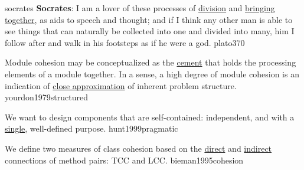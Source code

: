 \documentclass{article}
\begin{document}

\lnQuote
  {socrates}
  {\textbf{Socrates}: I am a lover of these processes of \ul{division} and \ul{bringing together}, as aids to speech and thought; and if I think any other man is able to see things that can naturally be collected into one and divided into many, him I follow after and walk in his footsteps as if he were a god.}
  {plato370}

  {Module cohesion may be conceptualized as the \ul{cement} that holds the processing elements of a module together. In a sense, a high degree of module cohesion is an indication of \ul{close approximation} of inherent problem structure.}
  {yourdon1979structured}

  {We want to design components that are self-contained: independent, and with a \ul{single}, well-defined purpose.}
  {hunt1999pragmatic}

  {We define two measures of class cohesion based on the \ul{direct} and \ul{indirect} connections of method pairs: TCC and LCC.}
  {bieman1995cohesion}

\end{document}
